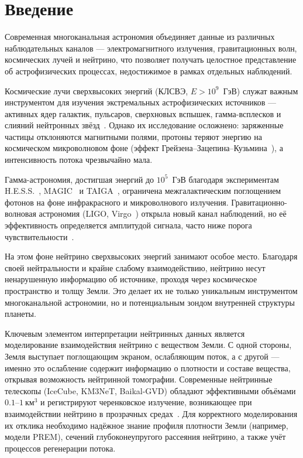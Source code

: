 \section{Введение}

Современная многоканальная астрономия объединяет данные из различных наблюдательных каналов — электромагнитного излучения, гравитационных волн, космических лучей и нейтрино, что позволяет получать целостное представление об астрофизических процессах, недостижимое в рамках отдельных наблюдений.

Космические лучи сверхвысоких энергий (КЛСВЭ, $E > 10^9$~ГэВ) служат важным инструментом для изучения экстремальных астрофизических источников — активных ядер галактик, пульсаров, сверхновых вспышек, гамма-всплесков и слияний нейтронных звёзд~\cite{auger2020anisotropy, auger2020spectrum, kotera2011astrophysics, kimura2017ultrahigh}.  
Однако их исследование осложнено: заряженные частицы отклоняются магнитными полями, протоны теряют энергию на космическом микроволновом фоне (эффект Грейзена–Зацепина–Кузьмина~\cite{greisen1966}), а интенсивность потока чрезвычайно мала.  

Гамма-астрономия, достигшая энергий до $10^5$~ГэВ благодаря экспериментам H.E.S.S.~\cite{hess2021}, MAGIC~\cite{hessandmagic2021} и TAIGA~\cite{Elshoukrofy:2023My}, ограничена межгалактическим поглощением фотонов на фоне инфракрасного и микроволнового излучения.  
Гравитационно-волновая астрономия (LIGO, Virgo~\cite{virgoandligo2016, Abbott:2017, Fan:2024}) открыла новый канал наблюдений, но её эффективность определяется амплитудой сигнала, часто ниже порога чувствительности~\cite{Isaacson1968, LIGOScientific:2018Sens}.  

На этом фоне нейтрино сверхвысоких энергий занимают особое место. Благодаря своей нейтральности и крайне слабому взаимодействию, нейтрино несут ненарушенную информацию об источнике, проходя через космическое пространство и толщу Земли. Это делает их не только уникальным инструментом многоканальной астрономии, но и потенциальным зондом внутренней структуры планеты.

Ключевым элементом интерпретации нейтринных данных является моделирование взаимодействия нейтрино с веществом Земли. С одной стороны, Земля выступает поглощающим экраном, ослабляющим поток, а с другой — именно это ослабление содержит информацию о плотности и составе вещества, открывая возможность нейтринной томографии.  
Современные нейтринные телескопы (IceCube, KM3NeT, Baikal-GVD) обладают эффективными объёмами $0.1$–$1~\text{км}^3$ и регистрируют черенковское излучение, возникающее при взаимодействии нейтрино в прозрачных средах~\cite{Troitskii:2024}. Для корректного моделирования их отклика необходимо надёжное знание профиля плотности Земли (например, модели PREM), сечений глубоконеупругого рассеяния нейтрино, а также учёт процессов регенерации потока.


